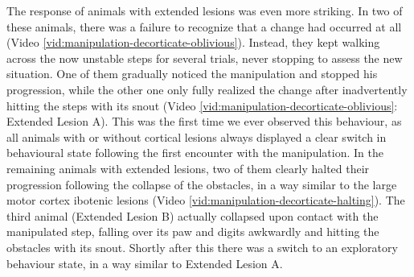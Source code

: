 The response of animals with extended lesions was even more striking. In two of these animals, there was a failure to recognize that a change had occurred at all (Video \ref{vid:manipulation-decorticate-oblivious}). Instead, they kept walking across the now unstable steps for several trials, never stopping to assess the new situation. One of them gradually noticed the manipulation and stopped his progression, while the other one only fully realized the change after inadvertently hitting the steps with its snout (Video \ref{vid:manipulation-decorticate-oblivious}: Extended Lesion A). This was the first time we ever observed this behaviour, as all animals with or without cortical lesions always displayed a clear switch in behavioural state following the first encounter with the manipulation. In the remaining animals with extended lesions, two of them clearly halted their progression following the collapse of the obstacles, in a way similar to the large motor cortex ibotenic lesions (Video \ref{vid:manipulation-decorticate-halting}). The third animal (Extended Lesion B) actually collapsed upon contact with the manipulated step, falling over its paw and digits awkwardly and hitting the obstacles with its snout. Shortly after this there was a switch to an exploratory behaviour state, in a way similar to Extended Lesion A.
